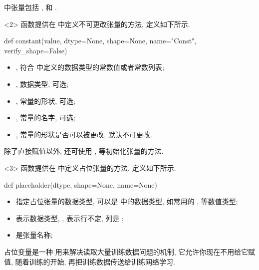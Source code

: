 \begin{frame}[fragile]{\insertsection}{\insertsubsection}
\tensorflow{} 中张量包括 ,  和 .

\begin{onlyenv}<2>
 函数提供在 \tensorflow{} 中定义不可更改张量的方法, 定义如下所示.

\begin{pythoncode}
def constant(value, dtype=None, shape=None, name="Const", verify_shape=False)
\end{pythoncode}

\begin{itemize}
\item {}, 符合 \tensorflow{} 中定义的数据类型的常数值或者常数列表;
\item {}, 数据类型, 可选;
\item {}, 常量的形状, 可选;
\item {}, 常量的名字, 可选;
\item {}, 常量的形状是否可以被更改, 默认不可更改.
\end{itemize}

除了直接赋值以外, 还可使用 ,  等初始化张量的方法.
\end{onlyenv}

\begin{onlyenv}<3>
 函数提供在 \tensorflow{} 中定义占位张量的方法, 定义如下所示.

\begin{pythoncode}
def placeholder(dtype, shape=None, name=None)
\end{pythoncode}

\begin{itemize}
\item {} 指定占位张量的数据类型, 可以是 \tensorflow{} 中的数据类型, 如常用的 ,  等数值类型;
\item {} 表示数据类型, , 表示行不定, 列是 ;
\item {} 是张量名称;
\end{itemize}

占位变量是一种 \tensorflow{} 用来解决读取大量训练数据问题的机制, 它允许你现在不用给它赋值, 随着训练的开始, 再把训练数据传送给训练网络学习.
\end{onlyenv}


\end{frame}
